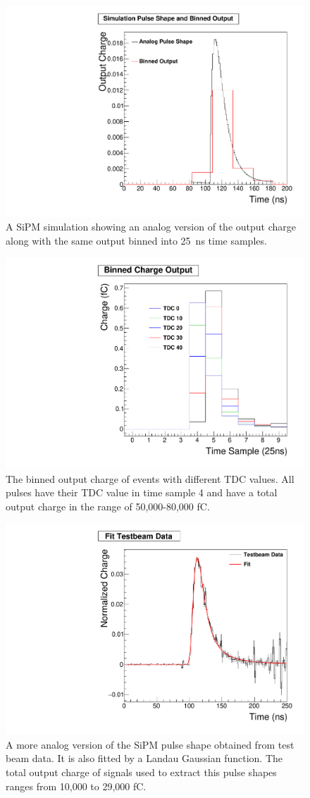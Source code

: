 \begin{figure}
\centering
\includegraphics[width=0.6\linewidth]{Figures/Bin.pdf}
\caption{A SiPM simulation showing an analog version of the output charge along with the same output binned into 25~ns time samples.}
\label{fig:bin}
\end{figure}

\begin{figure}
\centering
\includegraphics[width=0.6\linewidth]{Figures/Phase.pdf}
\caption{The binned output charge of events with different TDC values. All pulses have their TDC value in time sample 4 and have a total output charge in the range of 50,000-80,000 fC.}
\label{fig:Phase}
\end{figure}

\begin{figure}
\centering
\includegraphics[width=0.6\linewidth]{Figures/FittedPlot.pdf}
\caption{A more analog version of the SiPM pulse shape obtained from test beam data. It is also fitted by a Landau Gaussian function. The total output charge of signals used to extract this pulse shapes ranges from 10,000 to 29,000 fC.}
\label{fig:fit}
\end{figure}


